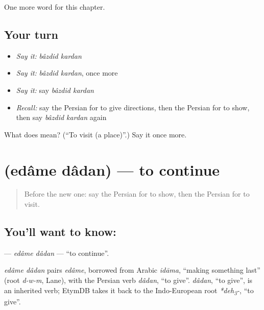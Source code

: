 \begin{grammarlens}[title={What you've built}]
One more word for this chapter.
\end{grammarlens}

\subsection*{Your turn}
\begin{itemize}
\raggedright
  \item \emph{Say it:} \emph{bâzdid kardan}
  \item \emph{Say it:} \emph{bâzdid kardan}, once more
  \item \emph{Say it:} say \emph{bâzdid kardan}
  \item \emph{Recall:} say the Persian for to give directions, then the Persian for to show, then say \emph{bâzdid kardan} again
\end{itemize}

\begin{tcolorbox}[breakable,colback=teal!4,colframe=teal!35!black,title={Before you move on}]
What does   mean? (\textquotedblleft{}To visit (a place)\textquotedblright{}.) Say it once more.
\end{tcolorbox}
\section[\texorpdfstring{\fa{ادامه} \fa{دادن} (edâme dâdan)}{ادامه دادن (edâme dâdan)}]{  (edâme dâdan) — to continue}

\label{lesson:FA-C144-edame-dadan}



\begin{quote}
Before the new one: say the Persian for to show, then the Persian for to visit.
\end{quote}

\subsection*{You'll want to know:  }
\textbf{ } — \emph{edâme dâdan} — \textquotedblleft{}to continue\textquotedblright{}.

\begin{cousinweb}
\emph{edâme dâdan} pairs \emph{edâme}, borrowed from Arabic \emph{idāma}, \textquotedblleft{}making something last\textquotedblright{} (root \emph{d-w-m}, Lane), with the Persian verb \emph{dâdan}, \textquotedblleft{}to give\textquotedblright{}. \emph{dâdan}, \textquotedblleft{}to give\textquotedblright{}, is an inherited verb; EtymDB takes it back to the Indo-European root \emph{*deh\textsubscript{3}-}, \textquotedblleft{}to give\textquotedblright{}.
\end{cousinweb}

